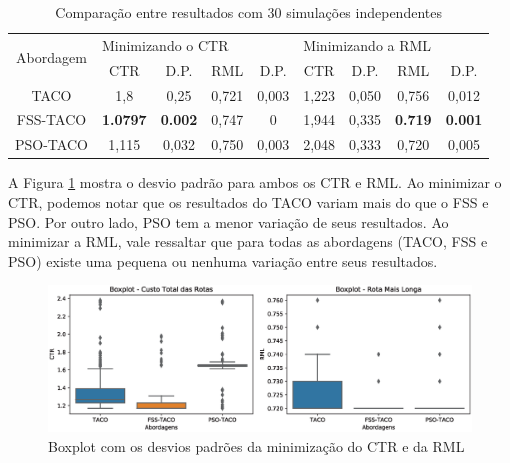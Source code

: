 \begin{table}[htb]
    \centering
    \caption{Comparação entre resultados com 30 simulações independentes} \label{tab:resultado-comparison}
\begin{tabular}{|c|c|c|c|c|c|c|c|c|}
\hline
\multirow{2}{*}{Abordagem} & \multicolumn{4}{l|}{Minimizando o CTR}           & \multicolumn{4}{l|}{Minimizando a RML}          \\ \cline{2-9} 
                            & CTR             & D.P.           & RML   & D.P.  & CTR   & D.P.  & RML            & D.P.           \\ \hline
TACO                       & 1,8             & 0,25           & 0,721 & 0,003 & 1,223 & 0,050 & 0,756          & 0,012          \\ \hline
FSS-TACO                   & \textbf{1.0797} & \textbf{0.002} & 0,747 & 0     & 1,944 & 0,335 & \textbf{0.719} & \textbf{0.001} \\ \hline
PSO-TACO                   & 1,115           & 0,032          & 0,750 & 0,003 & 2,048 & 0,333 & 0,720          & 0,005          \\ \hline
\end{tabular}
\end{table}

A Figura \ref{fig:resultados-boxplot} mostra o desvio padrão para ambos os CTR e RML. Ao minimizar o CTR, podemos notar que os resultados do TACO variam mais do que o FSS e PSO. Por outro lado, PSO tem a menor variação de seus resultados. Ao minimizar a RML, vale ressaltar que para todas as abordagens (TACO, FSS e PSO) existe uma pequena ou nenhuma variação entre seus resultados.

\begin{figure}[htb]
    \centering
    \caption{Boxplot com os desvios padrões da minimização do CTR e da RML} \label{fig:resultados-boxplot}
    \includegraphics[width=\textwidth]{imagens/boxplot-approaches.eps}
\end{figure}

